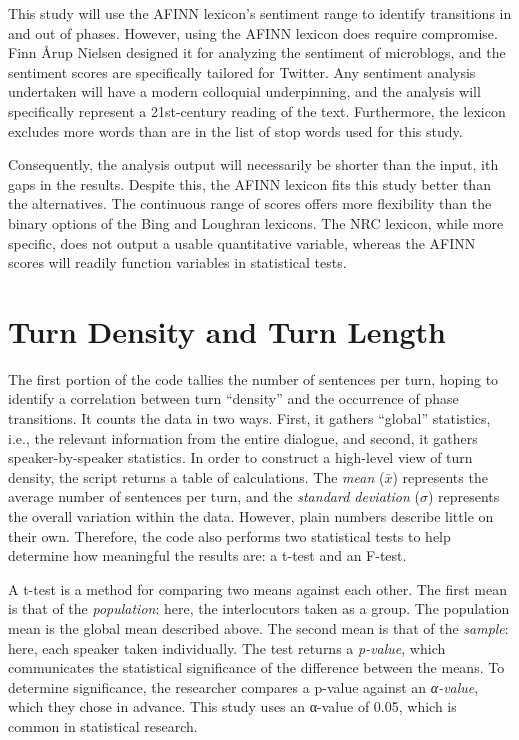 \documentclass[noraggedright]{turabian-researchpaper}
\begin{document}
This study will use the AFINN lexicon's sentiment range to identify transitions
in and out of phases. However, using the AFINN lexicon does require compromise.
Finn Årup Nielsen designed it for analyzing the sentiment of microblogs, and the
sentiment scores are specifically tailored for Twitter. Any sentiment analysis
undertaken will have a modern colloquial underpinning, and the analysis will
specifically represent a 21st-century reading of the text. Furthermore, the
lexicon excludes more words than are in the list of stop words used for this
study.

Consequently, the analysis output will necessarily be shorter than the input, 
ith gaps in the results. Despite this, the AFINN lexicon fits this study better
than the alternatives. The continuous range of scores offers more flexibility
than the binary options of the Bing and Loughran lexicons. The NRC lexicon,
while more specific, does not output a usable quantitative variable, whereas the
AFINN scores will readily function variables in statistical tests.

\section{Turn Density and Turn Length}



The first portion of the code tallies the number of sentences per turn, hoping to identify a correlation between turn ``density'' and the occurrence of phase transitions. It counts the data in two ways. First, it gathers ``global'' statistics, i.e., the relevant information from the entire dialogue, and second, it gathers speaker-by-speaker statistics. In order to construct a high-level view of turn density, the script returns a table of calculations. The \emph{mean} ($\bar{x}$) represents the average number of sentences per turn, and the \emph{standard deviation} ($\sigma$) represents the overall variation within the data. However, plain numbers describe little on their own. Therefore, the code also performs two statistical tests to help determine how meaningful the results are: a t-test and an F-test.

A t-test is a method for comparing two means against each other. The first mean is that of the \emph{population}: here, the interlocutors taken as a group. The population mean is the global mean described above. The second mean is that of the \emph{sample}: here, each speaker taken individually. The test returns a \emph{p-value}, which communicates the statistical significance of the difference between the means. To determine significance, the researcher compares a p-value against an \emph{α-value}, which they chose in advance. This study uses an α-value of 0.05, which is common in statistical research.
\end{document}
